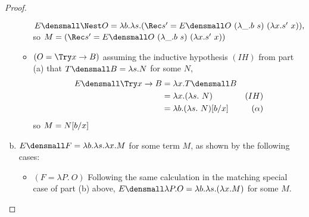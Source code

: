 \begin{proof}
\begin{enumerate}[(a)]
\begin{itemize}
        \begin{math}
          E\den{\Nest O}
          =
          \lambda b. \lambda s.
          (\Rec s' = E\den{O} ~ (\lambda \_. b ~ s) ~ (\lambda x. s' ~ x))
          ,
        \end{math}
        so $M = (\Rec s' = E\den{O} ~ (\lambda \_. b ~ s) ~ (\lambda x. s' ~ x))$
      \item $(O = \Try x \to B)$
        assuming the inductive hypothesis $(IH)$ from part (a) that
        $T\den{B} = \lambda s. N$ for some $N$,
        \begin{align*}
          E\den{\Try x \to B}
          &= \lambda x. T\den{B}
          \\
          &= \lambda x. (\lambda s.~ N)
          & (IH)
          \\
          &=\lambda b. (\lambda s.~ N)\subst{x}{b}
          & (\alpha)
        \end{align*}
        so $M = N\subst{x}{b}$
    \end{itemize}
  \item $E\den{F} = \lambda b. \lambda s. \lambda x. M$ for some term $M$, as shown by the following cases:
    \begin{itemize}
    \item $(F= \lambda P. ~O)$
      Following the same calculation in the matching special case of part (b) above,
      $E\den{\lambda P. O} = \lambda b. \lambda s. (\lambda x. M)$
      for some $M$.

\end{itemize}
\end{enumerate}
\end{proof}
